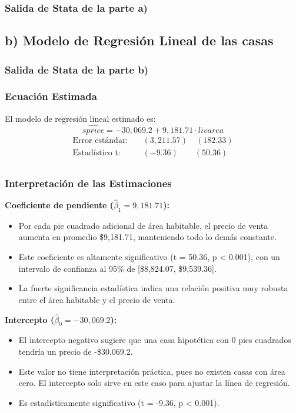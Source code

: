 \documentclass[12pt]{article}
\begin{document}
\subsubsection*{Salida de Stata de la parte a)}

%

\subsection*{b) Modelo de Regresión Lineal de las casas}
\subsubsection*{Salida de Stata de la parte b)}

\subsubsection*{Ecuación Estimada}
El modelo de regresión lineal estimado es:
\[
\widehat{sprice} = -30,069.2 + 9,181.71 \cdot livarea
\]
\begin{align}
\text{Error estándar:} \quad & (3,211.57) \quad (182.33) \\
\text{Estadístico t:} \quad & (-9.36) \quad\quad (50.36) \\
\end{align}

\subsubsection*{Interpretación de las Estimaciones}

\textbf{Coeficiente de pendiente ($\hat{\beta}_1 = 9,181.71$):}
\begin{itemize}
    \item Por cada pie cuadrado adicional de área habitable, el precio de venta aumenta en promedio \$9,181.71, manteniendo todo lo demás constante.
    \item Este coeficiente es altamente significativo (t = 50.36, p < 0.001), con un intervalo de confianza al 95\% de [\$8,824.07, \$9,539.36].
    \item La fuerte significancia estadística indica una relación positiva muy robusta entre el área habitable y el precio de venta.
\end{itemize}

\textbf{Intercepto ($\hat{\beta}_0 = -30,069.2$):}
\begin{itemize}
    \item El intercepto negativo sugiere que una casa hipotética con 0 pies cuadrados tendría un precio de -\$30,069.2.
    \item Este valor no tiene interpretación práctica, pues no existen casas con área cero. El intercepto solo sirve en este caso para ajustar la línea de regresión.
    \item Es estadísticamente significativo (t = -9.36, p < 0.001).
\end{itemize}
\end{document}
